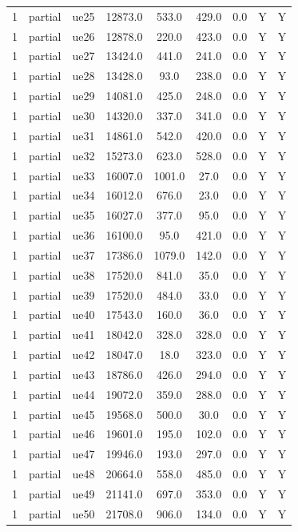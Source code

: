 \begin{table}[ht]
\begin{tabular}{|c|c|c|c|c|c|c|c|c|}
1 & partial & ue25 & 12873.0 & 533.0 & 429.0 & 0.0 & Y & Y \\
1 & partial & ue26 & 12878.0 & 220.0 & 423.0 & 0.0 & Y & Y \\
1 & partial & ue27 & 13424.0 & 441.0 & 241.0 & 0.0 & Y & Y \\
1 & partial & ue28 & 13428.0 & 93.0 & 238.0 & 0.0 & Y & Y \\
1 & partial & ue29 & 14081.0 & 425.0 & 248.0 & 0.0 & Y & Y \\
1 & partial & ue30 & 14320.0 & 337.0 & 341.0 & 0.0 & Y & Y \\
1 & partial & ue31 & 14861.0 & 542.0 & 420.0 & 0.0 & Y & Y \\
1 & partial & ue32 & 15273.0 & 623.0 & 528.0 & 0.0 & Y & Y \\
1 & partial & ue33 & 16007.0 & 1001.0 & 27.0 & 0.0 & Y & Y \\
1 & partial & ue34 & 16012.0 & 676.0 & 23.0 & 0.0 & Y & Y \\
1 & partial & ue35 & 16027.0 & 377.0 & 95.0 & 0.0 & Y & Y \\
1 & partial & ue36 & 16100.0 & 95.0 & 421.0 & 0.0 & Y & Y \\
1 & partial & ue37 & 17386.0 & 1079.0 & 142.0 & 0.0 & Y & Y \\
1 & partial & ue38 & 17520.0 & 841.0 & 35.0 & 0.0 & Y & Y \\
1 & partial & ue39 & 17520.0 & 484.0 & 33.0 & 0.0 & Y & Y \\
1 & partial & ue40 & 17543.0 & 160.0 & 36.0 & 0.0 & Y & Y \\
1 & partial & ue41 & 18042.0 & 328.0 & 328.0 & 0.0 & Y & Y \\
1 & partial & ue42 & 18047.0 & 18.0 & 323.0 & 0.0 & Y & Y \\
1 & partial & ue43 & 18786.0 & 426.0 & 294.0 & 0.0 & Y & Y \\
1 & partial & ue44 & 19072.0 & 359.0 & 288.0 & 0.0 & Y & Y \\
1 & partial & ue45 & 19568.0 & 500.0 & 30.0 & 0.0 & Y & Y \\
1 & partial & ue46 & 19601.0 & 195.0 & 102.0 & 0.0 & Y & Y \\
1 & partial & ue47 & 19946.0 & 193.0 & 297.0 & 0.0 & Y & Y \\
1 & partial & ue48 & 20664.0 & 558.0 & 485.0 & 0.0 & Y & Y \\
1 & partial & ue49 & 21141.0 & 697.0 & 353.0 & 0.0 & Y & Y \\
1 & partial & ue50 & 21708.0 & 906.0 & 134.0 & 0.0 & Y & Y \\

\end{tabular}
\end{table}
